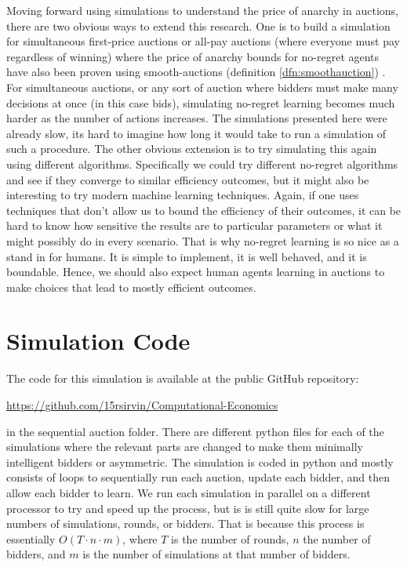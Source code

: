 \documentclass[12pt,twoside]{reedthesis}
\begin{document}
Moving forward using simulations to understand the price of anarchy in auctions, there are two obvious ways to extend this research. One is to build a simulation for simultaneous first-price auctions or all-pay auctions (where everyone must pay regardless of winning) where the price of anarchy bounds for no-regret agents have also been proven using smooth-auctions (definition \ref{dfn:smoothauction}) \citep{Roughgarden2017}. For simultaneous auctions, or any sort of auction where bidders must make many decisions at once (in this case bids), simulating no-regret learning becomes much harder as the number of actions increases. The simulations presented here were already slow, its hard to imagine how long it would take to run a simulation of such a procedure. The other obvious extension is to try simulating this again using different algorithms. Specifically we could try different no-regret algorithms and see if they converge to similar efficiency outcomes, but it might also be interesting to try modern machine learning techniques. Again, if one uses techniques that don't allow us to bound the efficiency of their outcomes, it can be hard to know how sensitive the results are to particular parameters or what it might possibly do in every scenario. That is why no-regret learning is so nice as a stand in for humans. It is simple to implement, it is well behaved, and it is boundable. Hence, we should also expect human agents learning in auctions to make choices that lead to mostly efficient outcomes.


    \appendix
      \chapter{Simulation Code}
      The code for this simulation is available at the public GitHub repository:
      \begin{center}
      	\url{https://github.com/15rsirvin/Computational-Economics}
      \end{center}
      in the sequential auction folder. 
      There are different python files for each of the simulations where the relevant parts are changed to make them minimally intelligent bidders or asymmetric. The simulation is coded in python and mostly consists of loops to sequentially run each auction, update each bidder, and then allow each bidder to learn. We run each simulation in parallel on a different processor to try and speed up the process, but is is still quite slow for large numbers of simulations, rounds, or bidders. That is because this process is essentially $O(T \cdot n \cdot m)$, where $T$ is the number of rounds, $n$ the number of bidders, and $m$ is the number of simulations at that number of bidders. 
      
\end{document}
